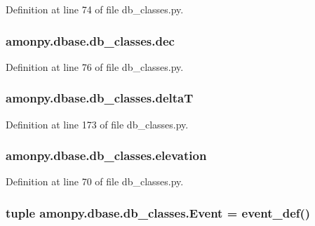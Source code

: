 Definition at line 74 of file db\-\_\-classes.\-py.

\hypertarget{namespaceamonpy_1_1dbase_1_1db__classes_ae45e4ba2ed3d299db4f4499e229453e4}{
\subsubsection[{dec}]{\setlength{\rightskip}{0pt plus 5cm}amonpy.\-dbase.\-db\-\_\-classes.\-dec}}\label{namespaceamonpy_1_1dbase_1_1db__classes_ae45e4ba2ed3d299db4f4499e229453e4}


Definition at line 76 of file db\-\_\-classes.\-py.

\hypertarget{namespaceamonpy_1_1dbase_1_1db__classes_a4da539a081d13412d12017ea4d2ef1e1}{
\subsubsection[{delta\-T}]{\setlength{\rightskip}{0pt plus 5cm}amonpy.\-dbase.\-db\-\_\-classes.\-delta\-T}}\label{namespaceamonpy_1_1dbase_1_1db__classes_a4da539a081d13412d12017ea4d2ef1e1}


Definition at line 173 of file db\-\_\-classes.\-py.

\hypertarget{namespaceamonpy_1_1dbase_1_1db__classes_a5a1632bf843d0f0ae5900eb04aaad787}{
\subsubsection[{elevation}]{\setlength{\rightskip}{0pt plus 5cm}amonpy.\-dbase.\-db\-\_\-classes.\-elevation}}\label{namespaceamonpy_1_1dbase_1_1db__classes_a5a1632bf843d0f0ae5900eb04aaad787}


Definition at line 70 of file db\-\_\-classes.\-py.

\hypertarget{namespaceamonpy_1_1dbase_1_1db__classes_addf9b6ab76d93bfdebf988a2895ff34f}{
\subsubsection[{Event}]{\setlength{\rightskip}{0pt plus 5cm}tuple amonpy.\-dbase.\-db\-\_\-classes.\-Event = {\bf event\-\_\-def}()}}\label{namespaceamonpy_1_1dbase_1_1db__classes_addf9b6ab76d93bfdebf988a2895ff34f}


